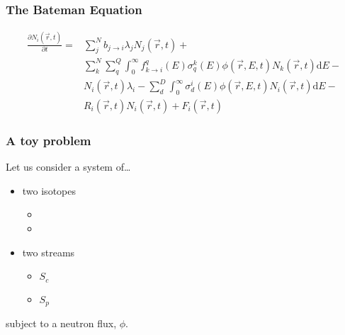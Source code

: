 \documentclass{beamer}
\begin{document}
\begin{frame}
\frametitle{The Bateman Equation}

    \begin{equation}
    \begin{split}
        \frac{\partial N_{i}(\vec{r},t)}{\partial t} = & \sum \limits_{j}^{N} 
        b_{j \rightarrow i} \lambda_{j} N_{j}(\vec{r}, t) + \\
        & \sum \limits_{k}^{N}
        \sum \limits_{q}^{Q} \int_{0}^{\infty} f_{k \rightarrow i}^{q}(E)
        \sigma_{q}^{k}(E) \phi(\vec{r},E,t) N_{k}(\vec{r},t)\mathrm{d}E - \\
        & N_{i}(\vec{r},t) \lambda_{i} - \sum \limits_{d}^{D} \int_{0}^{\infty}
        \sigma_{d}^{i}(E) \phi(\vec{r},E,t) N_{i}(\vec{r},t)\mathrm{d}E - \\
        & R_{i}(\vec{r},t) N_{i}(\vec{r},t) + F_{i}(\vec{r},t)
    \end{split}
    \end{equation}

\end{frame}

\begin{frame}
\frametitle{A toy problem}

    Let us consider a system of\ldots

    \hspace{2cm}

    \begin{itemize}
        \item two isotopes
            \begin{itemize}
                \item {} 
                \item {} 
            \end{itemize}
        \item two streams
            \begin{itemize}
                \item  $S_{c}$
                \item  $S_{p}$
            \end{itemize}
    \end{itemize}

    \hspace{2cm}

    subject to a neutron flux, $\phi$.

\end{frame}
\end{document}
